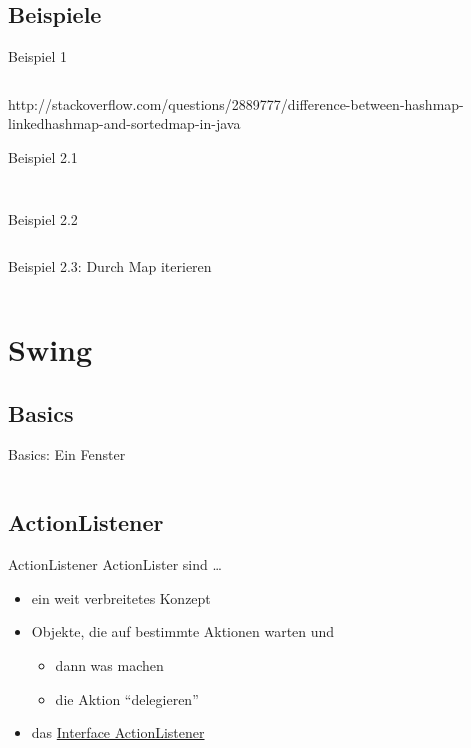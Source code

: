 \documentclass[usepdftitle=false,hyperref={pdfpagelabels=false}]{beamer}
\begin{document}
\subsection{Beispiele}
\begin{frame}{Beispiel 1}
    \inputminted[linenos=false, numbersep=5pt, tabsize=4, fontsize=\small]{java}{MapSimple.java}
http://stackoverflow.com/questions/2889777/difference-between-hashmap-linkedhashmap-and-sortedmap-in-java
\end{frame}

\begin{frame}{Beispiel 2.1}
    \inputminted[linenos=false, numbersep=5pt, tabsize=4, fontsize=\tiny, frame=lines,label=Person.java]{java}{Person.java}
    \inputminted[linenos=false, numbersep=5pt, tabsize=4, fontsize=\tiny, frame=lines,label=TelephoneNumber.java]{java}{TelephoneNumber.java}
\end{frame}

\begin{frame}{Beispiel 2.2}
    \inputminted[linenos=true, numbersep=5pt, tabsize=4, fontsize=\small]{java}{MapSimple2.java}
\end{frame}

\begin{frame}{Beispiel 2.3: Durch Map iterieren}
    \inputminted[linenos=false, numbersep=5pt, tabsize=4, fontsize=\small, firstline=15, lastline=20]{java}{singleLines.java}
\end{frame}

\section{Swing}
\subsection{Basics}
\begin{frame}{Basics: Ein Fenster}
    \inputminted[linenos=false, numbersep=5pt, tabsize=4, fontsize=\tiny]{java}{Swing1.java}
\end{frame}

\subsection{ActionListener}
\begin{frame}{ActionListener}
    ActionLister sind \dots
    \begin{itemize}[<+->]
        \item ein weit verbreitetes Konzept
        \item Objekte, die auf bestimmte Aktionen warten und
        \begin{itemize}
            \item dann was machen
            \item die Aktion "`delegieren"'
        \end{itemize}
        \item das \href{http://docs.oracle.com/javase/7/docs/api/java/awt/event/ActionListener.html}{Interface ActionListener}
    \end{itemize}
\end{frame}
\end{document}
